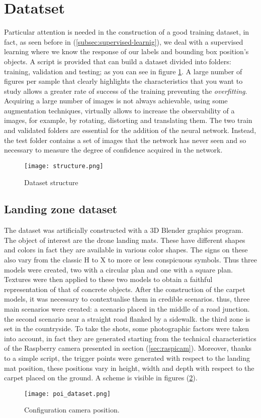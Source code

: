 
\section{Datatset}
\label{sec:dataset}
Particular attention is needed in the construction of a good training dataset, 
in fact, as seen before in (\ref{subsec:supervised-learnig}), we deal with a 
supervised learning where we know the response of our labels and bounding box position's objects.
A script is provided that can build a dataset divided into folders: training, 
validation and testing; as you can see in figure \ref{fig:datasetstructure}.
A large number of figures per sample that clearly highlights the characteristics 
that you want to study allows a greater rate of success of the training 
preventing the \emph{overfitting}.
Acquiring a large number of images is not always achievable, using some 
augmentation techniques, virtually allows to increase the observability of a 
images, for example, by rotating, distorting and translating them.
The two train and validated folders are essential for the addition of the 
neural network.
Instead, the test folder contains a set of images that the network has never 
seen and so necessary to measure the degree of confidence acquired in the network.\linebreak
%
\begin{figure}[htb]
	\centering
	\texttt{[image: structure.png]}
	\caption{Dataset structure}
	\label{fig:datasetstructure}
\end{figure}
%
\subsection{Landing zone dataset}
\label{ssec:landing-zone}
%
The dataset was artificially constructed with a 3D Blender graphics program. 
The object of interest are the drone landing mats. These have different shapes
and colors in fact they are available in various color shapes. The signs on
these also vary from the classic H to X to more or less conspicuous symbols.
Thus three models were created, two with a circular plan and one with a square
plan. Textures were then applied to these two models to obtain a faithful
representation of that of concrete objects. After the construction of the carpet
models, it was necessary to contextualise them in credible scenarios. thus,
three main scenarios were created: a scenario placed in the middle of a road
junction. the second scenario near a straight road flanked by a sidewalk. the
third zone is set in the countryside. To take the shots, some photographic
factors were taken into account, in fact they are generated starting from the
technical characteristics of the Raspberry camera presented in section
(\ref{sec:raspicam}). Moreover, thanks to a simple script, the trigger points
were generated with respect to the landing mat position, these positions vary in
height, width and depth with respect to the carpet placed on the ground. A
scheme is visible in figures (\ref{fig:poi_dataset}).
%
\begin{figure}[!h]
	\centering
	\texttt{[image: poi\_dataset.png]}
	\caption{Configuration camera position.}
	\label{fig:poi_dataset}
\end{figure}

